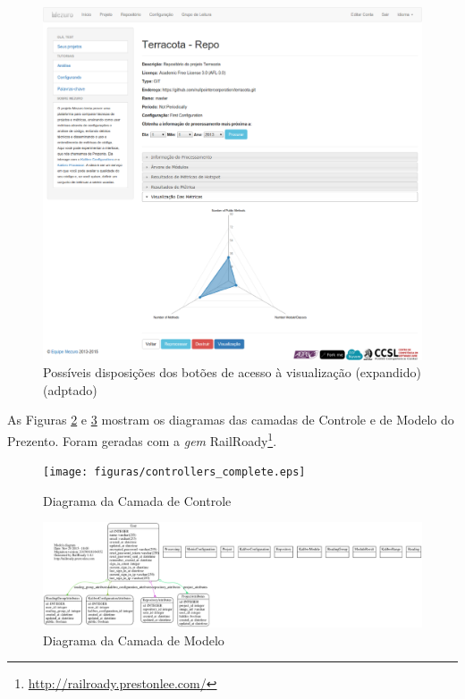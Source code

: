 \begin{figure}[!htb]
	\centering
    \includegraphics[keepaspectratio=true,scale=0.33]
    {figuras/exmplo_disposicao_botao_visualizacao_2.eps}
  \caption{Possíveis disposições dos botões de acesso à visualização
  (expandido) (adptado) \cite{filgueiras2014mezuro}}
  \label{fig:exmplo_disposicao_botao_visualizacao_2}
\end{figure}

\newpage

As Figuras \ref{fig:controllers_complete} e \ref{fig:models_complete} mostram os
diagramas das camadas de Controle e de Modelo do Prezento. Foram geradas com a
\textit{gem} RailRoady\footnote{\url{http://railroady.prestonlee.com/}}.

\begin{figure}[!htb]
	\centering
    \texttt{[image: figuras/controllers\_complete.eps]}
  \caption{Diagrama da Camada de Controle}
  \label{fig:controllers_complete}
\end{figure}


\begin{figure}[!htb]
	\centering
    \includegraphics[keepaspectratio=true,scale=0.25]
    {figuras/models_complete.eps}
  \caption{Diagrama da Camada de Modelo}
  \label{fig:models_complete}
\end{figure}

